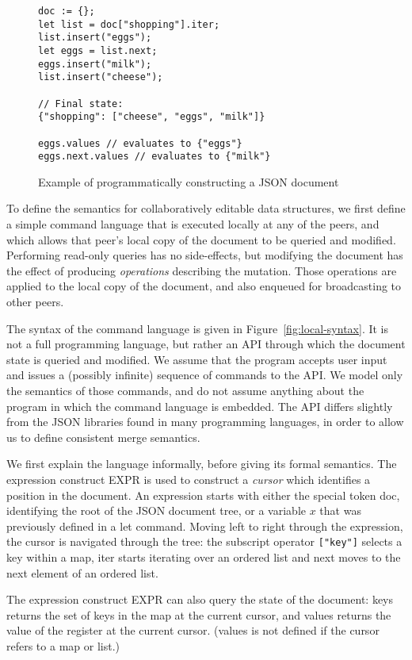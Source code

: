 \documentclass[a4paper,twocolumn,10pt]{article}
\begin{document}
\begin{figure}
\centering
\begin{verbatim}
doc := {};
let list = doc["shopping"].iter;
list.insert("eggs");
let eggs = list.next;
eggs.insert("milk");
list.insert("cheese");

// Final state:
{"shopping": ["cheese", "eggs", "milk"]}

eggs.values // evaluates to {"eggs"}
eggs.next.values // evaluates to {"milk"}
\end{verbatim}
\caption{Example of programmatically constructing a JSON document}\label{fig:make-doc}
\end{figure}

To define the semantics for collaboratively editable data structures, we first define a simple command language that is executed locally at any of the peers, and which allows that peer's local copy of the document to be queried and modified. Performing read-only queries has no side-effects, but modifying the document has the effect of producing \emph{operations} describing the mutation. Those operations are applied to the local copy of the document, and also enqueued for broadcasting to other peers.

The syntax of the command language is given in Figure~\ref{fig:local-syntax}. It is not a full programming language, but rather an API through which the document state is queried and modified. We assume that the program accepts user input and issues a (possibly infinite) sequence of commands to the API. We model only the semantics of those commands, and do not assume anything about the program in which the command language is embedded. The API differs slightly from the JSON libraries found in many programming languages, in order to allow us to define consistent merge semantics.

We first explain the language informally, before giving its formal semantics. The expression construct EXPR is used to construct a \emph{cursor} which identifies a position in the document. An expression starts with either the special token \textsf{doc}, identifying the root of the JSON document tree, or a variable $x$ that was previously defined in a \textsf{let} command. Moving left to right through the expression, the cursor is navigated through the tree: the subscript operator \verb|["key"]| selects a key within a map, \textsf{iter} starts iterating over an ordered list and \textsf{next} moves to the next element of an ordered list.

The expression construct EXPR can also query the state of the document: \textsf{keys} returns the set of keys in the map at the current cursor, and \textsf{values} returns the value of the register at the current cursor. (\textsf{values} is not defined if the cursor refers to a map or list.)
\end{document}
